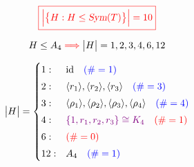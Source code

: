 \begin{frame}
  \[
	\textcolor{red}{\boxed{\Big\lvert \big\{H: H \le \textsl{Sym}(T)\big\} \Big\rvert = 10}}
  \]

  \pause
  \[
	H \le A_4 \textcolor{red}{\implies} \big\lvert H \big\rvert = 1, 2, 3, 4, 6, 12
  \]

  \pause
  \[
	\big\lvert H \big\rvert = \begin{cases}
	  1: & \text{id} \quad \textcolor{blue}{(\# = 1)} \\[3pt]
	  2: & \langle r_1 \rangle, \langle r_2 \rangle, \langle r_3 \rangle \quad \textcolor{blue}{(\# = 3)} \\[3pt]
	  3: & \langle \rho_1 \rangle, \langle \rho_2 \rangle, \langle \rho_3 \rangle, \langle \rho_4 \rangle \quad \textcolor{blue}{(\# = 4)} \\[3pt]
	  4: & \textcolor{violet}{\left\{1, r_1, r_2, r_3\right\} \cong K_4} \quad \textcolor{red}{(\# = 1)} \\[3pt]
	  6: & \textcolor{red}{(\# = 0)} \\[3pt]
	  12: & A_4 \quad \textcolor{blue}{(\# = 1)}
	\end{cases}
  \]

\end{frame}
